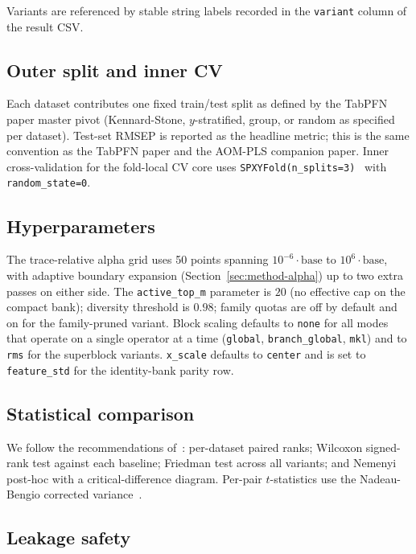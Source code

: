 \documentclass[11pt,a4paper]{article}
\begin{document}
Variants are referenced by stable string labels recorded in the
\texttt{variant} column of the result CSV.

\subsection{Outer split and inner CV}

Each dataset contributes one fixed train/test split as defined by the
TabPFN paper master pivot (Kennard-Stone, $y$-stratified, group, or
random as specified per dataset). Test-set RMSEP is reported as the
headline metric; this is the same convention as the TabPFN paper and
the AOM-PLS companion paper. Inner cross-validation for the
fold-local CV core uses
\texttt{SPXYFold(n\_splits=3)}~\citep{galvao2005method} with
\texttt{random\_state=0}.

\subsection{Hyperparameters}

The trace-relative alpha grid uses 50 points spanning
$10^{-6}\cdot\mathrm{base}$ to $10^{6}\cdot\mathrm{base}$, with
adaptive boundary expansion (Section~\ref{sec:method-alpha}) up to
two extra passes on either side. The \texttt{active\_top\_m}
parameter is $20$ (no effective cap on the compact bank); diversity
threshold is $0.98$; family quotas are off by default and on for the
family-pruned variant. Block scaling defaults to \texttt{none} for
all modes that operate on a single operator at a time
(\texttt{global}, \texttt{branch\_global}, \texttt{mkl}) and to
\texttt{rms} for the superblock variants. \texttt{x\_scale} defaults
to \texttt{center} and is set to \texttt{feature\_std} for the
identity-bank parity row.

\subsection{Statistical comparison}

We follow the recommendations
of~\citet{demsar2006statistical, benavoli2017time}: per-dataset paired
ranks; Wilcoxon signed-rank test against each baseline; Friedman test
across all variants; and Nemenyi post-hoc with a critical-difference
diagram. Per-pair $t$-statistics use the Nadeau-Bengio corrected
variance~\citep{nadeau2003inference}.

\subsection{Leakage safety}
\end{document}
